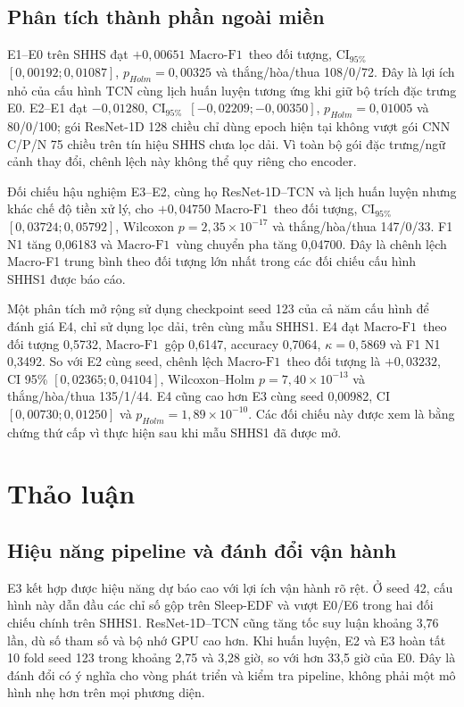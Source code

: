 \documentclass[10pt,a4paper]{article}
\newcommand{\mf}{\ensuremath{\mathrm{Macro\mbox{-}F1}}}
\newcommand{\ci}{\ensuremath{\mathrm{CI}_{95\%}}}
\begin{document}
\subsection{Phân tích thành phần ngoài miền}

E1--E0 trên SHHS đạt $+0,00651$ \mf\ theo đối tượng, \ci\ $[0,00192;0,01087]$, $p_{Holm}=0,00325$ và thắng/hòa/thua 108/0/72. Đây là lợi ích nhỏ của cấu hình TCN cùng lịch huấn luyện tương ứng khi giữ bộ trích đặc trưng E0. E2--E1 đạt $-0,01280$, \ci\ $[-0,02209;-0,00350]$, $p_{Holm}=0,01005$ và 80/0/100; gói ResNet-1D 128 chiều chỉ dùng epoch hiện tại không vượt gói CNN C/P/N 75 chiều trên tín hiệu SHHS chưa lọc dải. Vì toàn bộ gói đặc trưng/ngữ cảnh thay đổi, chênh lệch này không thể quy riêng cho encoder.

Đối chiếu hậu nghiệm E3--E2, cùng họ ResNet-1D--TCN và lịch huấn luyện nhưng khác chế độ tiền xử lý, cho $+0,04750$ \mf\ theo đối tượng, \ci\ $[0,03724;0,05792]$, Wilcoxon $p=2,35\times10^{-17}$ và thắng/hòa/thua 147/0/33. F1 N1 tăng 0,06183 và \mf\ vùng chuyển pha tăng 0,04700. Đây là chênh lệch Macro-F1 trung bình theo đối tượng lớn nhất trong các đối chiếu cấu hình SHHS1 được báo cáo.

Một phân tích mở rộng sử dụng checkpoint seed 123 của cả năm cấu hình để đánh giá E4, chỉ sử dụng lọc dải, trên cùng mẫu SHHS1. E4 đạt \mf\ theo đối tượng 0,5732, \mf\ gộp 0,6147, accuracy 0,7064, $\kappa=0,5869$ và F1 N1 0,3492. So với E2 cùng seed, chênh lệch \mf\ theo đối tượng là $+0,03232$, CI 95\% $[0,02365;0,04104]$, Wilcoxon--Holm $p=7,40\times10^{-13}$ và thắng/hòa/thua 135/1/44. E4 cũng cao hơn E3 cùng seed 0,00982, CI $[0,00730;0,01250]$ và $p_{Holm}=1,89\times10^{-10}$. Các đối chiếu này được xem là bằng chứng thứ cấp vì thực hiện sau khi mẫu SHHS1 đã được mở.

\section{Thảo luận}

\subsection{Hiệu năng pipeline và đánh đổi vận hành}

E3 kết hợp được hiệu năng dự báo cao với lợi ích vận hành rõ rệt. Ở seed 42, cấu hình này dẫn đầu các chỉ số gộp trên Sleep-EDF và vượt E0/E6 trong hai đối chiếu chính trên SHHS1. ResNet-1D--TCN cũng tăng tốc suy luận khoảng 3,76 lần, dù số tham số và bộ nhớ GPU cao hơn. Khi huấn luyện, E2 và E3 hoàn tất 10 fold seed 123 trong khoảng 2,75 và 3,28 giờ, so với hơn 33,5 giờ của E0. Đây là đánh đổi có ý nghĩa cho vòng phát triển và kiểm tra pipeline, không phải một mô hình nhẹ hơn trên mọi phương diện.
\end{document}
